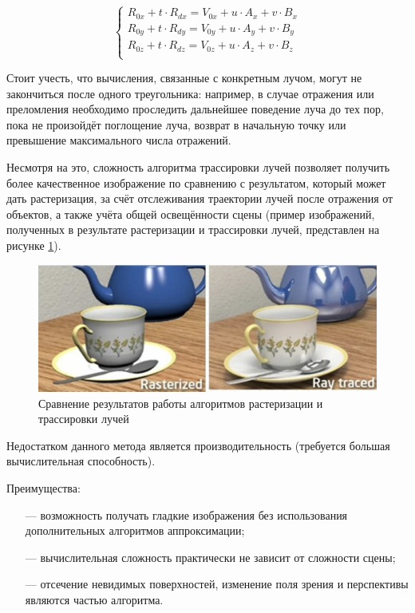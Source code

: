 \begin{equation}
	\begin{cases}
		R_{0x} + t \cdot R_{dx} = V_{0x} + u \cdot A_x + v \cdot B_x \\
		R_{0y} + t \cdot R_{dy} = V_{0y} + u \cdot A_y + v \cdot B_y \\
		R_{0z} + t \cdot R_{dz} = V_{0z} + u \cdot A_z + v \cdot B_z \\
	\end{cases}
	\label{eq:rsys}
\end{equation}

Стоит учесть, что вычисления, связанные с конкретным лучом, могут не 
закончиться после одного треугольника: например, в случае отражения или 
преломления необходимо проследить дальнейшее поведение луча до тех пор, 
пока не произойдёт поглощение луча, возврат в начальную точку или превышение максимального числа отражений.

Несмотря на это, сложность алгоритма трассировки лучей позволяет получить более качественное изображение по сравнению с результатом, который может дать растеризация, за счёт отслеживания траектории лучей после отражения от объектов, а также учёта общей освещённости сцены (пример изображений, полученных в результате растеризации и трассировки лучей, представлен на рисунке \ref{fig:rasterisationVsRayTracing}). \clearpage

\begin{figure}[h]
	\centering
	\captionsetup{justification=centering}
	\includegraphics[width=120mm]{img/rasterisationVsRayTracing.png}
	\caption{Сравнение результатов работы алгоритмов растеризации и 
		трассировки лучей}
	\label{fig:rasterisationVsRayTracing}
\end{figure}

Недостатком данного метода является производительность (требуется большая вычислительная способность).


Преимущества:
\begin{itemize}[leftmargin=1.6\parindent]
	\item[---] возможность получать гладкие изображения без использования 
	дополнительных алгоритмов аппроксимации;
	\item[---] вычислительная сложность практически не зависит от сложности сцены;
	\item[---] отсечение невидимых поверхностей, изменение поля зрения и 
	перспективы являются частью алгоритма.
\end{itemize}

